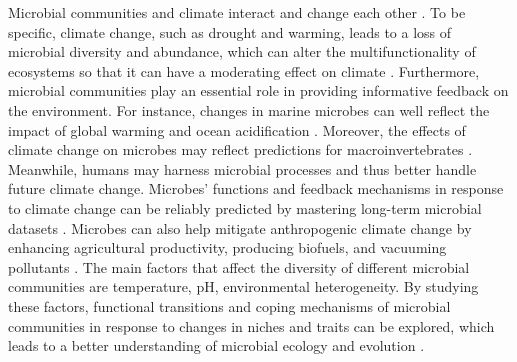 \documentclass[11pt, a4paper]{article}
\begin{document}
\begin{spacing}{1.5}
Microbial communities and climate interact and change each other \citep{hutchins2019climate}. To be specific, climate change, such as drought and warming, leads to a loss of microbial diversity and abundance, which can alter the multifunctionality of ecosystems so that it can have a moderating effect on climate \citep{delgado2017soil, delgado2016microbial}. Furthermore, microbial communities play an essential role in providing informative feedback on the environment. For instance, changes in marine microbes can well reflect the impact of global warming and ocean acidification \citep{boyd2018experimental}.  Moreover, the effects of climate change on microbes may reflect predictions for macroinvertebrates \citep{hotaling2019microbial}. Meanwhile, humans may harness microbial processes and thus better handle future climate change. Microbes' functions and feedback mechanisms in response to climate change can be reliably predicted by mastering long-term microbial datasets \citep{buttigieg2018marine, dore2009physical, saba2010challenges}. Microbes can also help mitigate anthropogenic climate change by enhancing agricultural productivity, producing biofuels, and vacuuming pollutants \citep{cavicchioli2019scientists}. The main factors that affect the diversity of different microbial communities are temperature, pH, environmental heterogeneity. By studying these factors, functional transitions and coping mechanisms of microbial communities in response to changes in niches and traits can be explored, which leads to a better understanding of microbial ecology and evolution \citep{lozupone2007global}. 


\end{spacing}
\end{document}

